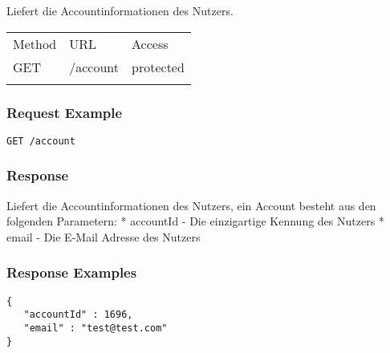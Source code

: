Liefert die Accountinformationen des Nutzers.

\begin{longtable}[c]{@{}lll@{}}
\toprule\addlinespace
Method & URL & Access
\\\addlinespace
\midrule\endhead
GET & /account & protected
\\\addlinespace
\bottomrule
\end{longtable}

\subsubsection{Request Example}\label{request-example}

\begin{verbatim}
GET /account
\end{verbatim}

\subsubsection{Response}\label{response}

Liefert die Accountinformationen des Nutzers, ein Account besteht aus
den folgenden Parametern: * accountId - Die einzigartige Kennung des
Nutzers * email - Die E-Mail Adresse des Nutzers

\subsubsection{Response Examples}\label{response-examples}

\begin{verbatim}
{
   "accountId" : 1696,
   "email" : "test@test.com"
}
\end{verbatim}
